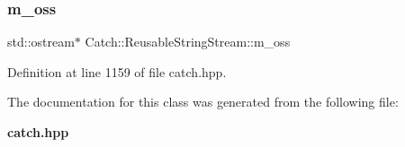 \subsubsection{m\_oss}
{\footnotesize\ttfamily std\+::ostream$\ast$ Catch\+::\+Reusable\+String\+Stream\+::m\+\_\+oss\hspace{0.3cm}{\ttfamily [private]}}



Definition at line 1159 of file catch.\+hpp.



The documentation for this class was generated from the following file\+:\begin{DoxyCompactItemize}
\item 
\textbf{ catch.\+hpp}\end{DoxyCompactItemize}
